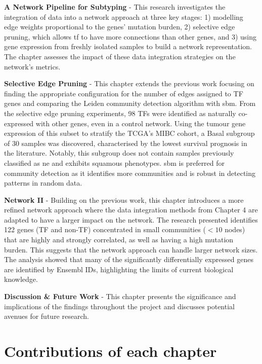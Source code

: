 \textbf{A Network Pipeline for Subtyping} - This research investigates the integration of data into a network approach at three key stages: 1) modelling edge weights proportional to the genes' mutation burden, 2) selective edge pruning, which allows \acrlong{tf} to have more connections than other genes, and 3) using gene expression from freshly isolated samples to build a network representation. The chapter assesses the impact of these data integration strategies on the network's metrics.


\textbf{Selective Edge Pruning} - This chapter extends the previous work focusing on finding the appropriate configuration for the number of edges assigned to TF genes and comparing the Leiden community detection algorithm with \acrfull{sbm}. From the selective edge pruning experiments, 98 TFs were identified as naturally co-expressed with other genes, even in a control network. Using the tumour gene expression of this subset to stratify the TCGA's MIBC cohort, a Basal subgroup of 30 samples was discovered, characterised by the lowest survival prognosis in the literature. Notably, this subgroup does not contain samples previously classified as \acrlong{ne} and exhibits squamous phenotypes. \acrshort{sbm} is preferred for community detection as it identifies more communities and is robust in detecting patterns in random data.


\textbf{Network II} - Building on the previous work, this chapter introduces a more refined network approach where the data integration methods from Chapter 4 are adapted to have a larger impact on the network. The research presented identifies 122 genes (TF and non-TF) concentrated in small communities (\(<10\) nodes) that are highly and strongly correlated, as well as having a high mutation burden. This suggests that the network approach can handle larger network sizes. The analysis showed that many of the significantly differentially expressed genes are identified by Ensembl IDs, highlighting the limits of current biological knowledge.


\textbf{Discussion \& Future Work} - This chapter presents the significance and implications of the findings throughout the project and discusses potential avenues for future research.


\section{Contributions of each chapter}

